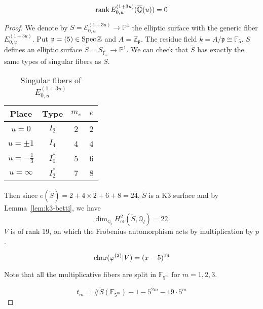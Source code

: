 \documentclass[main]{subfiles}
\begin{document}
\begin{thm}
    \begin{equation*}
        \operatorname{rank} E_{0,u}^{(1 + 3u)}(\overline{\mathbb{Q}}(u)) = 0
    \end{equation*}
\end{thm}
\begin{proof}
    We denote by $S=\mathcal{E}_{0,u}^{(1 + 3u)} \to \mathbb{P}^1$ the elliptic surface with the generic fiber $E_{0,u}^{(1 + 3u)}$.
    Put $\mathfrak{p}=(5)\in \operatorname{Spec} \mathbb{Z}$ and $A = \mathbb{Z}_{\mathfrak{p}}$.
    The residue field $k=A/\mathfrak{p}\cong \mathbb{F}_{5}$.
    $S$ defines an elliptic surface $\tilde{S} = S_{\overline{\mathbb{F}_{5}}} \to \mathbb{P}^1$.
    We can check that $\tilde{S}$ has exactly the same types of singular fibers as $S$.

    \begin{table}[ht]
        \centering
        \caption{Singular fibers of $E_{0,u}^{(1 + 3u)}$}
        \begin{tabular}{|c|c|c|c|}
            \hline
            Place            & Type    & $m_v$ & $e$ \\
            \hline
            $u=0$            & $I_2$   & 2     & 2   \\
            $u=\pm 1$        & $I_4$   & 4     & 4   \\
            $u=-\frac{1}{3}$ & $I_0^*$ & 5     & 6   \\
            $u=\infty$       & $I_2^*$ & 7     & 8   \\
            \hline
        \end{tabular}
        \label{tab:E_{0,u}^{(1 + 3u)}}
    \end{table}
    Then since $e(\tilde{S})=2+4 \times2+6+8=24$, $\tilde{S}$ is a K3 surface and by Lemma~\ref{lem:k3-betti}, we have
    \begin{equation*}
        \dim_{\mathbb{Q}_{l}} H_{\text{\'et}}^{2}(\tilde{S}, \mathbb{Q}_{l}) = 22.
    \end{equation*}
    $V$ is of rank 19, on which the Frobenius automorphism acts by multiplication by $p$.

    \begin{equation*}
        \operatorname{char} (\varphi^{(2)} | V) = (x - 5)^{19}
    \end{equation*}

    Note that all the multiplicative fibers are split in $\mathbb{F}_{5^{m}}$ for $m=1,2,3$.

    \begin{equation*}
        t_{m} = \# \tilde{S}(\mathbb{F}_{5^{m}}) - 1 - 5^{2m} - 19 \cdot 5^{m}
    \end{equation*}


\end{proof}
\end{document}

